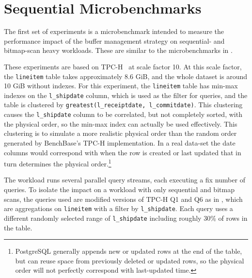 \section{Sequential Microbenchmarks\label{sec:eval-seq-micro}}





The first set of experiments is a microbenchmark intended to measure the performance impact of the buffer management strategy on sequential- and bitmap-scan heavy workloads. These are similar to the microbenchmarks in \cite{pbm}. %


These experiments are based on TPC-H~\cite{tpch} at scale factor 10. At this scale factor, the \verb|lineitem| table takes approximately 8.6 GiB, and the whole dataset is around 10 GiB without indexes. For this experiment, the \verb|lineitem| table has min-max indexes on the \verb|l_shipdate| column, which is used as the filter for queries, and the table is clustered by \verb|greatest(l_receiptdate, l_commitdate)|. This clustering causes the \verb|l_shipdate| column to be correlated, but not completely sorted, with the physical order, so the min-max index can actually be used effectively. This clustering is to simulate a more realistic physical order than the random order generated by BenchBase's TPC-H implementation. In a real data-set the date columns would correspond with when the row is created or last updated that in turn determines the physical order.\footnote{PostgreSQL generally appends new or updated rows at the end of the table, but can reuse space from previously deleted or updated rows, so the physical order will not perfectly correspond with last-updated time.}

The workload runs several parallel query streams, each executing a fix number of queries. To isolate the impact on a workload with only sequential and bitmap scans, the queries used are modified versions of TPC-H Q1 and Q6 as in \cite{pbm}, which are aggregations on \verb|lineitem| with a filter by \verb|l_shipdate|. Each query uses a different randomly selected range of \verb|l_shipdate| including roughly 30\% of rows in the table.


